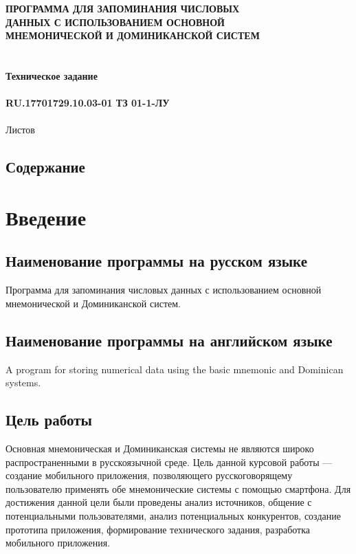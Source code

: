 \documentclass[draft]{article}
\begin{document}
\bigskip
\begin{center}
\topskip=0pt
\vspace*{\fill}
\textbf{ПРОГРАММА ДЛЯ ЗАПОМИНАНИЯ ЧИСЛОВЫХ\\
 ДАННЫХ С ИСПОЛЬЗОВАНИЕМ ОСНОВНОЙ\\
 МНЕМОНИЧЕСКОЙ И ДОМИНИКАНСКОЙ СИСТЕМ\\
~\\
~\\
Техническое задание\\
~\\
RU.17701729.10.03-01 ТЗ 01-1-ЛУ}\\
~\\
Листов \ztotpages\\
\vspace*{\fill}
\end{center}
\begin{center}
\end{center}
\newpage
\begin{center}
\section {Содержание}
\tableofcontents
\end{center}
\newpage
\section {Введение}
\subsection{Наименование программы на русском языке}
Программа для запоминания числовых данных с использованием основной мнемонической и Доминиканской систем.
\subsection{Наименование программы на английском языке}
A program for storing numerical data using the basic mnemonic and Dominican systems.
\subsection{Цель работы}
Основная мнемоническая и Доминиканская системы не являются широко распространенными в русскоязычной среде. Цель данной курсовой работы — создание мобильного приложения, позволяющего русскоговорящему пользователю применять обе мнемонические системы с помощью смартфона. Для достижения данной цели были проведены анализ источников, общение с потенциальными пользователями, анализ потенциальных конкурентов, создание прототипа приложения, формирование технического задания, разработка мобильного приложения.
\end{document}
